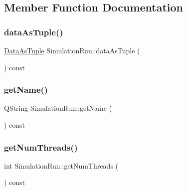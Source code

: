 \subsection{Member Function Documentation}
\mbox{\label{class_simulation_run_a4deb60285fa85aafcd335ba73e6a2f79}} 
\subsubsection{\texorpdfstring{dataAsTuple()}{dataAsTuple()}}
{\footnotesize\ttfamily \mbox{\hyperlink{class_simulation_run_a0088973963e3846e2543a2b14c686d7b}{Data\+As\+Tuple}} Simulation\+Run\+::data\+As\+Tuple (\begin{DoxyParamCaption}{ }\end{DoxyParamCaption}) const\hspace{0.3cm}{\ttfamily [inline]}}

\mbox{\label{class_simulation_run_aa7b0671440d777540383a42e6e551998}} 
\subsubsection{\texorpdfstring{getName()}{getName()}}
{\footnotesize\ttfamily Q\+String Simulation\+Run\+::get\+Name (\begin{DoxyParamCaption}{ }\end{DoxyParamCaption}) const\hspace{0.3cm}{\ttfamily [inline]}}

\mbox{\label{class_simulation_run_ae0469ae8b80f42d56bf876baff89a3b8}} 
\subsubsection{\texorpdfstring{getNumThreads()}{getNumThreads()}}
{\footnotesize\ttfamily int Simulation\+Run\+::get\+Num\+Threads (\begin{DoxyParamCaption}{ }\end{DoxyParamCaption}) const\hspace{0.3cm}{\ttfamily [inline]}}

